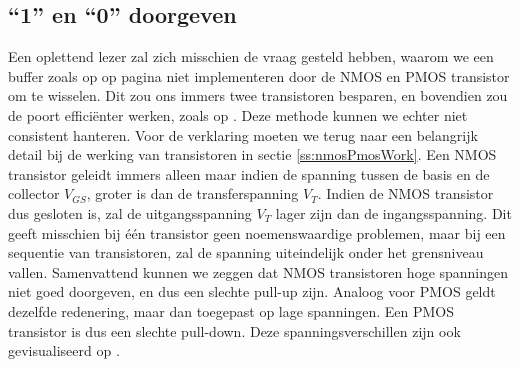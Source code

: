 \subsection{``1'' en ``0'' doorgeven}
Een oplettend lezer zal zich misschien de vraag gesteld hebben, waarom we een buffer zoals op  op pagina \pageref{fig:bufferCmos} niet implementeren door de NMOS en PMOS transistor om te wisselen. Dit zou ons immers twee transistoren besparen, en bovendien zou de poort effici\"enter werken, zoals op . Deze methode kunnen we echter niet consistent hanteren. Voor de verklaring moeten we terug naar een belangrijk detail bij de werking van transistoren in sectie \ref{ss:nmosPmosWork}. Een NMOS transistor geleidt immers alleen maar indien de spanning tussen de basis en de collector $V_{GS}$, groter is dan de transferspanning $V_{T}$. Indien de NMOS transistor dus gesloten is, zal de uitgangsspanning $V_{T}$ lager zijn dan de ingangsspanning. Dit geeft misschien bij \'e\'en transistor geen noemenswaardige problemen, maar bij een sequentie van transistoren, zal de spanning uiteindelijk onder het grensniveau vallen. Samenvattend kunnen we zeggen dat NMOS transistoren hoge spanningen niet goed doorgeven, en dus een slechte pull-up zijn. Analoog voor PMOS geldt dezelfde redenering, maar dan toegepast op lage spanningen. Een PMOS transistor is dus een slechte pull-down. Deze spanningsverschillen zijn ook gevisualiseerd op .
